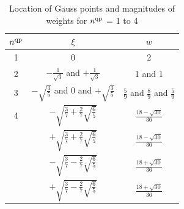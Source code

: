 \documentclass[12pt, a4paper]{article}
\numberwithin{equation}{section}
\begin{document}
\begin{table}[h!]
    \centering
    \begin{tabular}{ccc}
    \toprule
        $n^{\rm qp}$   &   $\xi$   &   $w$ \\
    \toprule
        1 &  0  &   2\\
    \midrule
        2 & $-\frac{1}{\sqrt{3}}$ and $+\frac{1}{\sqrt{3}}$ &   1 and 1 \\
    \midrule
        3 &  $-\sqrt{\frac{3}{5}}$ and 0 and $+\sqrt{\frac{3}{5}}$ &   $\frac{5}{9}$ and $\frac{8}{9}$ and $\frac{5}{9}$ \\
    \midrule
        4 & $-\sqrt{\frac{3}{7}+\frac{2}{7}\sqrt{\frac{6}{5}}}$   &   $\frac{18-\sqrt{30}}{36}$ \\
        & $+\sqrt{\frac{3}{7}+\frac{2}{7}\sqrt{\frac{6}{5}}}$   &   $\frac{18-\sqrt{30}}{36}$ \\
        & $-\sqrt{\frac{3}{7}-\frac{2}{7}\sqrt{\frac{6}{5}}}$   &   $\frac{18+\sqrt{30}}{36}$ \\
        & $+\sqrt{\frac{3}{7}-\frac{2}{7}\sqrt{\frac{6}{5}}}$   &  $\frac{18+\sqrt{30}}{36}$ \\
    \bottomrule
    \end{tabular}
    \caption{Location of Gauss points and magnitudes of weights for $n^{\rm qp}$ = 1 to 4}
    \label{tab:quadrature}
\end{table}
\end{document}
